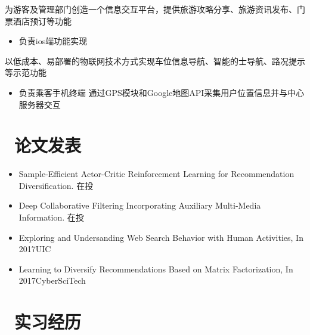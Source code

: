 \documentclass{resume}
\begin{document}
\begin{onehalfspacing}
为游客及管理部门创造一个信息交互平台，提供旅游攻略分享、旅游资讯发布、门票酒店预订等功能
\begin{itemize}
	\item 负责ios端功能实现
\end{itemize}
\end{onehalfspacing}
\begin{onehalfspacing}
以低成本、易部署的物联网技术方式实现车位信息导航、智能的士导航、路况提示等示范功能
\begin{itemize}
  \item 负责乘客手机终端  通过GPS模块和Google地图API采集用户位置信息并与中心服务器交互
\end{itemize}
\end{onehalfspacing}

\section{\faBook\ 论文发表}
\begin{itemize}
\item Sample-Efficient Actor-Critic Reinforcement Learning for Recommendation Diversification. 在投
\item Deep Collaborative Filtering Incorporating Auxiliary Multi-Media Information. 在投
\item Exploring and Undersanding Web Search Behavior with Human Activities, In 2017UIC
\item Learning to Diversify Recommendations Based on Matrix Factorization, In 2017CyberSciTech
\end{itemize}

\section{\faUsers\ 实习经历}
\end{document}
